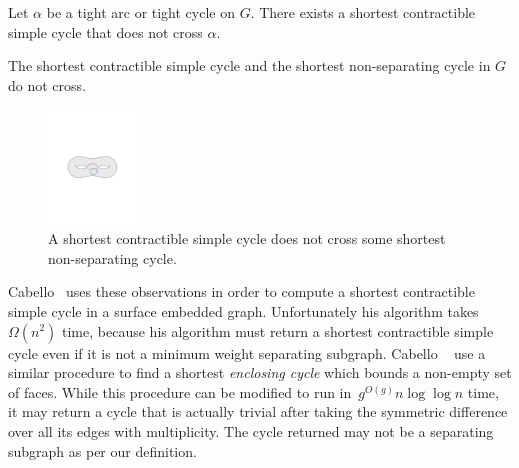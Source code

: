 \begin{lemma}
\label{lem:disjoint-tight-arc}
Let $\alpha$ be a tight arc or tight cycle on $G$.  There exists a shortest contractible simple cycle that does not cross $\alpha$.
\end{lemma}

\begin{corollary}
\label{cor:disjoint-sep-cycle}
The shortest contractible simple cycle and the shortest non-separating cycle in $G$ do not cross.
\end{corollary}

\begin{figure}[h]
\centering
\includegraphics[height=1.2in]{Fig/shortcon-vs-shortnonsep}
\caption{A shortest contractible simple cycle does not cross some shortest non-separating cycle.}
\label{fig:global_shortcon-vs-shortnonsep}
\end{figure}

Cabello~\cite{c-fscss-10} uses these observations in order to compute a shortest contractible simple cycle in a surface embedded graph.
Unfortunately his algorithm takes~$\Omega(n^2)$ time, because his algorithm must return a shortest contractible simple cycle even if it is not a minimum weight separating subgraph.
Cabello \etal~\cite{cdem-fotc-10} use a similar procedure to find a shortest \emph{enclosing cycle} which bounds a non-empty set of faces.
While this procedure can be modified to run in~$g^{O(g)} n \log \log n$ time, it may return a cycle that is actually trivial after taking the symmetric difference over all its edges with multiplicity.
The cycle returned may not be a separating subgraph as per our definition.


